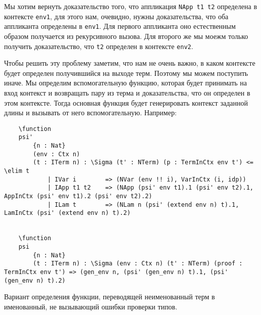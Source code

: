 Мы хотим вернуть доказательство того, что аппликация \texttt{NApp t1 t2} определена в контексте \texttt{env1}, для этого нам, очевидно, нужны доказательства, что оба аппликанта определены в \texttt{env1}. Для первого аппликанта оно естественным образом получается из рекурсивного вызова. Для второго же мы моежм только получить доказательство,  что \texttt{t2}  определен в контексте \texttt{env2}.

Чтобы решить эту проблему заметим, что нам не очень важно, в каком контексте будет определен получившийся на выходе терм. Поэтому мы можем поступить иначе. Мы определим вспомогательную функцию, которая будет принимать на вход контекст и возвращать пару из терма и доказательства, что он определен в этом контексте. Тогда основная функция будет генерировать контекст заданной длины и вызывать от него вспомогательную. Например:

\begin{listing}[H]
  \begin{verbatim}
    \function
    psi'
        {n : Nat}
        (env : Ctx n)
        (t : ITerm n) : \Sigma (t' : NTerm) (p : TermInCtx env t') <= \elim t
            | IVar i        => (NVar (env !! i), VarInCtx (i, idp))
            | IApp t1 t2    => (NApp (psi' env t1).1 (psi' env t2).1, AppInCtx (psi' env t1).2 (psi' env t2).2)
            | ILam t        => (NLam n (psi' (extend env n) t).1, LamInCtx (psi' (extend env n) t).2)


    \function
    psi
        {n : Nat}
        (t : ITerm n) : \Sigma (env : Ctx n) (t' : NTerm) (proof : TermInCtx env t') => (gen_env n, (psi' (gen_env n) t).1, (psi' (gen_env n) t).2)
  \end{verbatim}
  \caption{Вариант определения функции, переводящей неименованный терм в именованный, не вызывающий ошибки проверки типов.}
\end{listing}

